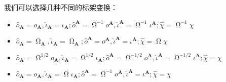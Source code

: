 我们可以选择几种不同的标架变换：
\begin{itemize}
	\item $\hat{o}_{\boldsymbol{A}} =o_{\boldsymbol{A}} ,\hat{\iota }_{\boldsymbol{A}} =\iota _{\boldsymbol{A}} ;\hat{o}^{\boldsymbol{A}} =\upOmega^{-1} o^{\boldsymbol{A}} ,\hat{\iota }^{\boldsymbol{A}} =\upOmega^{-1} \iota ^{\boldsymbol{A}} ;\hat{\chi } =\upOmega^{-1} \chi $
	\item $\hat{o}_{\boldsymbol{A}} =\upOmega_{\boldsymbol{A}} ,\hat{\iota }_{\boldsymbol{A}} =\upOmega_{\boldsymbol{A}} ;\hat{o}^{\boldsymbol{A}} =o^{\boldsymbol{A}} ,\hat{\iota }^{\boldsymbol{A}} =\iota ^{\boldsymbol{A}} ;\hat{\chi } =\upOmega\chi $
	\item $\hat{o}_{\boldsymbol{A}} =\upOmega^{1/2} o_{\boldsymbol{A}} ,\hat{\iota }_{\boldsymbol{A}} =\upOmega^{1/2} \iota _{\boldsymbol{A}} ;\hat{o}^{\boldsymbol{A}} =\upOmega^{-1/2} o^{\boldsymbol{A}} ,\hat{\iota }^{\boldsymbol{A}} =\upOmega^{-1/2} \iota ^{\boldsymbol{A}} ;\hat{\chi } =\chi $
	\item $\hat{o}_{\boldsymbol{A}} =o_{\boldsymbol{A}} ,\hat{\iota }_{\boldsymbol{A}} =\upOmega\iota _{\boldsymbol{A}} ;\hat{o}^{\boldsymbol{A}} =\upOmega^{-1} o^{\boldsymbol{A}} ,\hat{\iota }^{\boldsymbol{A}} =\iota ^{\boldsymbol{A}} ;\hat{\chi } =\chi $
\end{itemize}

